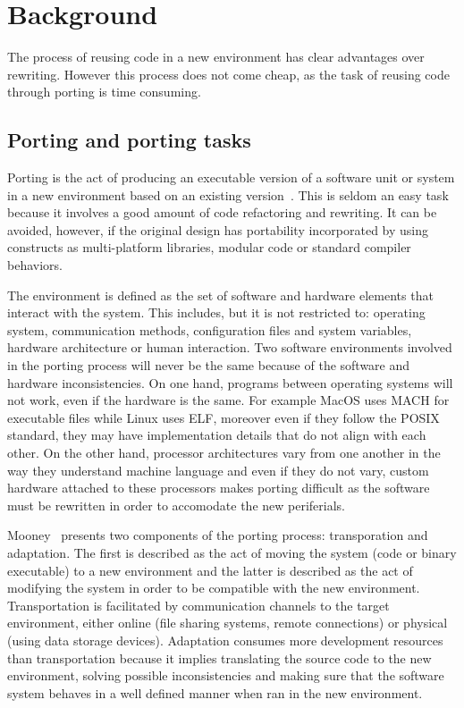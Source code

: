 \section{Background} \label{sec:background}

The process of reusing code in a new environment has clear advantages over
rewriting. However this process does not come cheap, as the task of reusing code
through porting is time consuming.

\subsection{Porting and porting tasks}

Porting is the act of producing an executable version of a software unit or
system in a new environment based on an existing
version~\cite{mooney1990strategies}. This is
seldom an easy task because it involves a good amount of code refactoring and
rewriting. It can be avoided, however, if the original design has portability
incorporated by using constructs as multi-platform libraries, modular code or
standard compiler behaviors.

The environment is defined as the set of software and hardware elements that
interact with the system. This includes, but it is not restricted to: operating
system, communication methods, configuration files and system variables,
hardware architecture or human interaction. Two software environments involved
in the porting process will never be the same because of the software and
hardware inconsistencies. On one hand, programs between operating systems will
not work, even if the hardware is the same. For example MacOS uses MACH for
executable files while Linux uses ELF, moreover even if they follow the POSIX
standard, they may have implementation details that do not align with each
other. On the other hand, processor architectures vary from one another in the
way they understand machine language and even if they do not vary, custom
hardware attached to these processors makes porting difficult as the software
must be rewritten in order to accomodate the new periferials.

Mooney~\cite{mooney1990strategies} presents two components of the porting process:
transporation and adaptation. The first is described as the act of moving the
system (code or binary executable) to a new environment and the latter is
described as the act of modifying the system in order to be compatible with the
new environment. Transportation is facilitated by communication channels to the
target environment, either online (file sharing systems, remote connections) or
physical (using data storage devices). Adaptation consumes more development
resources than transportation because it implies translating the source code to
the new environment, solving possible inconsistencies and making sure that the
software system behaves in a well defined manner when ran in the new
environment.

